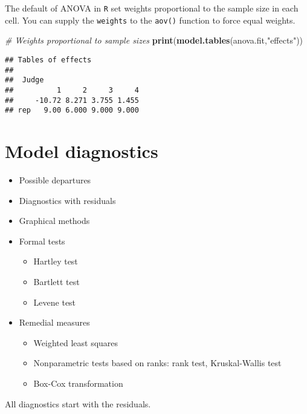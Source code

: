 \documentclass[12pt,]{book}
\newenvironment{Shaded}{\begin{snugshade}}{\end{snugshade}}
\newcommand{\KeywordTok}[1]{\textcolor[rgb]{0.13,0.29,0.53}{\textbf{#1}}}
\newcommand{\StringTok}[1]{\textcolor[rgb]{0.31,0.60,0.02}{#1}}
\newcommand{\CommentTok}[1]{\textcolor[rgb]{0.56,0.35,0.01}{\textit{#1}}}
\newcommand{\OperatorTok}[1]{\textcolor[rgb]{0.81,0.36,0.00}{\textbf{#1}}}
\newcommand{\NormalTok}[1]{#1}
\providecommand{\tightlist}{%
  \setlength{\itemsep}{0pt}\setlength{\parskip}{0pt}}
\begin{document}
The default of ANOVA in \texttt{R} set weights proportional to the
sample size in each cell. You can supply the \texttt{weights} to the
\texttt{aov()} function to force equal weights.

\begin{Shaded}
\begin{Highlighting}[]
\CommentTok{# Weights proportional to sample sizes }
\KeywordTok{print}\NormalTok{(}\KeywordTok{model.tables}\NormalTok{(anova.fit,}\StringTok{"effects"}\NormalTok{))}
\end{Highlighting}
\end{Shaded}

\begin{verbatim}
## Tables of effects
## 
##  Judge 
##          1     2     3     4
##     -10.72 8.271 3.755 1.455
## rep   9.00 6.000 9.000 9.000
\end{verbatim}

\section{Model diagnostics}\label{model-diagnostics}

\begin{itemize}
\tightlist
\item
  Possible departures
\item
  Diagnostics with residuals
\item
  Graphical methods
\item
  Formal tests

  \begin{itemize}
  \tightlist
  \item
    Hartley test
  \item
    Bartlett test
  \item
    Levene test
  \end{itemize}
\item
  Remedial measures

  \begin{itemize}
  \tightlist
  \item
    Weighted least squares
  \item
    Nonparametric tests based on ranks: rank test, Kruskal-Wallis test
  \item
    Box-Cox transformation
  \end{itemize}
\end{itemize}

All diagnostics start with the residuals.

\begin{Shaded}
\end{Shaded}
\end{document}
